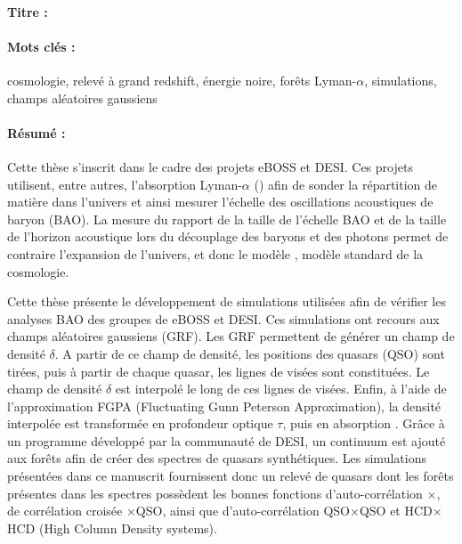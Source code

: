 \begin{mdframed}[linecolor=Prune,linewidth=1]
\vspace{-.25cm}
\paragraph*{Titre :} \PhDTitle{}

\begin{small}
\vspace{-.25cm}
\paragraph*{Mots clés :} cosmologie, relevé à grand redshift, énergie noire, forêts Lyman-$\alpha$, simulations, champs aléatoires gaussiens

\vspace{-.5cm}
\begin{multicols}{2}
  \paragraph*{Résumé :}
  Cette thèse s'inscrit dans le cadre des projets eBOSS et DESI.
  Ces projets utilisent, entre autres, l'absorption Lyman-$\alpha$ (\lya) afin de sonder la répartition de matière dans l'univers et ainsi mesurer l'échelle des oscillations acoustiques de baryon (BAO).
  La mesure du rapport de la taille de l'échelle BAO et de la taille de l'horizon acoustique lors du découplage des baryons et des photons permet de contraire l'expansion de l'univers, et donc le modèle \lcdm{}, modèle standard de la cosmologie.

  Cette thèse présente le développement de simulations utilisées afin de vérifier les analyses BAO des groupes \lya{} de eBOSS et DESI.
  Ces simulations ont recours aux champs aléatoires gaussiens (GRF).
  Les GRF permettent de générer un champ de densité $\delta$.
  A partir de ce champ de densité, les positions des quasars (QSO) sont tirées, puis à partir de chaque quasar, les lignes de visées sont constituées.
  Le champ de densité $\delta$ est interpolé le long de ces lignes de visées.
  Enfin, à l'aide de l'approximation FGPA (Fluctuating Gunn Peterson Approximation), la densité interpolée est transformée en profondeur optique $\tau$, puis en absorption \lya{}.
  Grâce à un programme développé par la communauté de DESI, un continuum est ajouté aux forêts \lya{} afin de créer des spectres de quasars synthétiques.
  Les simulations présentées dans ce manuscrit fournissent donc un relevé de quasars dont les forêts \lya{} présentes dans les spectres possèdent les bonnes fonctions d'auto-corrélation \lya{}$\times$\lya{}, de corrélation croisée \lya{}$\times$QSO, ainsi que d'auto-corrélation QSO$\times$QSO et HCD$\times$HCD (High Column Density systems).


\end{multicols}
\end{small}
\end{mdframed}
